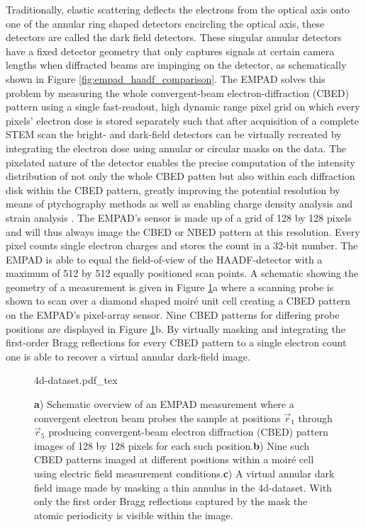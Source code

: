Traditionally, elastic scattering deflects the electrons from the optical axis onto one of the annular ring shaped detectors encircling the optical axis, these detectors are called the dark field detectors. These singular annular detectors have a fixed detector geometry that only captures signals at certain camera lengths when diffracted beams are impinging on the detector, as schematically shown in Figure \ref{fig:empad_haadf_comparison}. The EMPAD solves this problem by measuring the whole convergent-beam electron-diffraction (CBED) pattern using a single fast-readout, high dynamic range pixel grid on which every pixels' electron dose is stored separately such that after acquisition of a complete STEM scan the bright- and dark-field detectors can be virtually recreated by integrating the electron dose using annular or circular masks on the data.
The pixelated nature of the detector enables the precise computation of the intensity distribution of not only the whole CBED patten but also within each diffraction disk within the CBED pattern, greatly improving the potential resolution by means of ptychography methods \cite{pennycookEfficientPhaseContrast2015, yangEfficientPhaseContrast2015a} as well as enabling charge density analysis \cite{hachtelSubAngstromElectricField2018,wenMapping1DConfined2022,fangAtomicElectrostaticMaps2019} and strain analysis \cite{hanStrainMappingTwoDimensional2018, ophusFourDimensionalScanningTransmission2019}.
The EMPAD's sensor is made up of a grid of 128 by 128 pixels and will thus always image the CBED or NBED pattern at this resolution. Every pixel counts single electron charges and stores the count in a 32-bit number. The EMPAD is able to equal the field-of-view of the HAADF-detector with a maximum of 512 by 512 equally positioned scan points. A schematic showing the geometry of a measurement is given in Figure \ref{fig:4d_dataset}a where a scanning probe is shown to scan over a diamond shaped moiré unit cell creating a CBED pattern on the EMPAD's pixel-array sensor. Nine CBED patterns for differing probe positions are displayed in Figure \ref{fig:4d_dataset}b. By virtually masking and integrating the first-order Bragg reflections for every CBED pattern to a single electron count one is able to recover a virtual annular dark-field image.

\begin{figure}[h]
	\centering
	\def\svgwidth{1\linewidth}
	{4d-dataset.pdf_tex}
	\caption{\textbf{a}) Schematic overview of an EMPAD measurement where a convergent electron beam probes the sample at positions $\vec{r}_1$ through $\vec{r}_5$ producing convergent-beam electron diffraction (CBED) pattern images of 128 by 128 pixels for each such position.\textbf{b}) Nine such CBED patterns imaged at different positions within a moiré cell using electric field measurement conditions.\textbf{c}) A virtual annular dark field image made by masking a thin annulus in the 4d-dataset. With only the first order Bragg reflections captured by the mask the atomic periodicity is visible within the image.}
	\label{fig:4d_dataset}
\end{figure}

